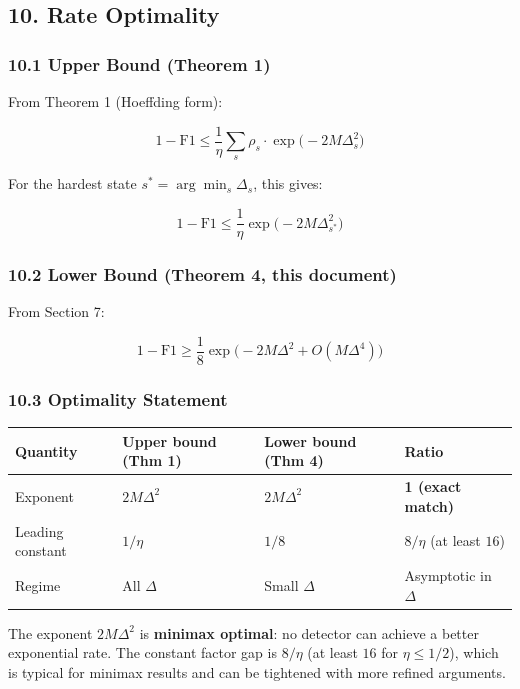 \documentclass[
  12pt,
]{article}
\begin{document}
\subsection{10. Rate Optimality}\label{rate-optimality}

\subsubsection{10.1 Upper Bound (Theorem
1)}\label{upper-bound-theorem-1}

From Theorem 1 (Hoeffding form):

\[1 - \text{F1} \leq \frac{1}{\eta} \sum_{s} \rho_s \cdot \exp\!\bigl(-2M\Delta_s^2\bigr)\]

For the hardest state \(s^* = \arg\min_s \Delta_s\), this gives:

\[1 - \text{F1} \leq \frac{1}{\eta} \exp\!\bigl(-2M\Delta_{s^*}^2\bigr)\]

\subsubsection{10.2 Lower Bound (Theorem 4, this
document)}\label{lower-bound-theorem-4-this-document}

From Section 7:

\[1 - \text{F1} \geq \frac18 \exp\!\bigl(-2M\Delta^2 + O(M\Delta^4)\bigr)\]

\subsubsection{10.3 Optimality Statement}\label{optimality-statement}

\begin{longtable}[]{@{}llll@{}}
\toprule\noalign{}
Quantity & Upper bound (Thm 1) & Lower bound (Thm 4) & Ratio \\
\midrule\noalign{}
\endhead
\bottomrule\noalign{}
\endlastfoot
Exponent & \(2M\Delta^2\) & \(2M\Delta^2\) & \textbf{1 (exact match)} \\
Leading constant & \(1/\eta\) & \(1/8\) & \(8/\eta\) (at least
\(16\)) \\
Regime & All \(\Delta\) & Small \(\Delta\) & Asymptotic in \(\Delta\) \\
\end{longtable}

The exponent \(2M\Delta^2\) is \textbf{minimax optimal}: no detector can
achieve a better exponential rate. The constant factor gap is \(8/\eta\)
(at least \(16\) for \(\eta \leq 1/2\)), which is typical for minimax
results and can be tightened with more refined arguments.
\end{document}
